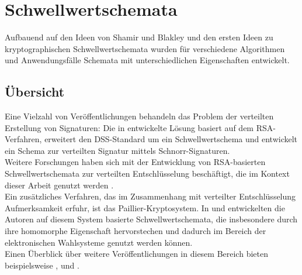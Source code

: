 \section{Schwellwertschemata}

\label{sec_state_threshold}





Aufbauend auf den Ideen von Shamir und Blakley und den ersten Ideen zu kryptographischen Schwellwertschemata wurden für verschiedene Algorithmen und Anwendungsfälle Schemata mit unterschiedlichen Eigenschaften entwickelt.

\subsection{Übersicht}

Eine Vielzahl von Veröffentlichungen behandeln das Problem der verteilten Erstellung von Signaturen: Die in \cite{shoup2000practical} entwickelte Lösung basiert auf dem RSA-Verfahren, \cite{gennaro1996robustdss} erweitert den DSS-Standard um ein Schwellwertschema und \cite{stinson2001provably} entwickelt ein Schema zur verteilten Signatur mittels Schnorr-Signaturen.\\
Weitere Forschungen haben sich mit der Entwicklung von RSA-basierten Schwellwertschemata zur verteilten Entschlüsselung beschäftigt, die im Kontext dieser Arbeit genutzt werden \cite{frankel1997proactive, gennaro1996robust, rabin1998simplified}. \\
Ein zusätzliches Verfahren, das im Zusammenhang mit verteilter Entschlüsselung Aufmerksamkeit erfuhr, ist das Paillier-Kryptosystem. In \cite{damgard2001} und \cite{fouque2000sharing} entwickelten die Autoren auf diesem System basierte Schwellwertschemata, die insbesondere durch ihre homomorphe Eigenschaft hervorstechen und dadurch im Bereich der elektronischen Wahlsysteme genutzt werden können.\\
Einen Überblick über weitere Veröffentlichungen in diesem Bereich bieten beispielsweise \cite{desmedt1997some}, \cite{gemmell1997} und \cite{desmedt1993}.

